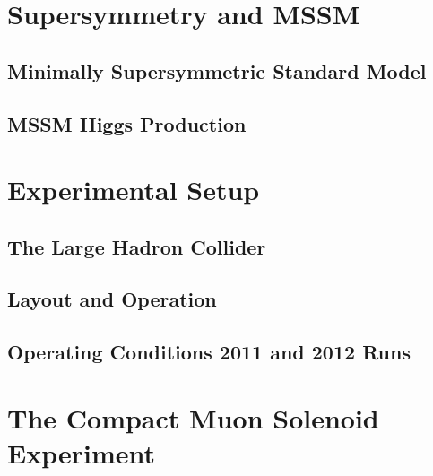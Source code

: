 \documentclass[oneside, letterpaper, 12pt, oldfontcommands]{memoir}
\begin{document}
\chapter{Supersymmetry and MSSM}
\section{Minimally Supersymmetric Standard Model}
\section{MSSM Higgs Production}

\chapter{Experimental Setup}
\section{The Large Hadron Collider}
\section{Layout and Operation}
\section{Operating Conditions 2011 and 2012 Runs}

\chapter{The Compact Muon Solenoid Experiment}


\end{document}
